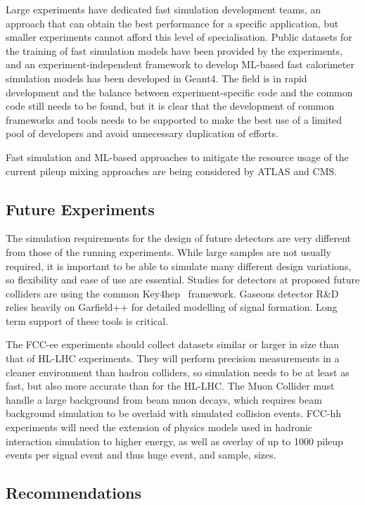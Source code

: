 \documentclass[10pt,a4paper]{article}
\begin{document}
Large experiments have dedicated fast simulation development teams, an approach
that can obtain the best performance for a specific application, but smaller
experiments cannot afford this level of specialisation. Public datasets for the
training of fast simulation models have been provided by the experiments, and an
experiment-independent framework to develop ML-based fast calorimeter simulation
models has been developed in Geant4. The field is in rapid development and the
balance between experiment-specific code and the common code still needs to be
found, but it is clear that the development of common frameworks and tools needs
to be supported to make the best use of a limited pool of developers and avoid
unnecessary duplication of efforts.

Fast simulation and ML-based approaches to mitigate the resource usage
of the current pileup mixing approaches are being considered by ATLAS
and CMS.

\subsection{Future Experiments}\label{future-experiments}

The simulation requirements for the design of future detectors are very
different from those of the running experiments. While large samples are not
usually required, it is important to be able to simulate many
different design variations, so flexibility and ease of use are
essential. Studies for detectors at proposed future colliders are using
the common Key4hep~\cite{Ganis2022} framework. Gaseous detector R\&D relies
heavily on Garfield++\cite{garfield++} for detailed modelling of signal
formation. Long term support of these tools is critical.

The FCC-ee experiments should collect datasets similar or
larger in size than that of HL-LHC experiments. They will perform precision
measurements in a cleaner environment than hadron colliders, so simulation
needs to be at least as fast, but also more accurate than for the HL-LHC. The
Muon Collider must handle a large background from beam muon decays, which
requires beam background simulation to be overlaid with simulated collision
events. FCC-hh experiments will need the extension of physics models used in
hadronic interaction simulation to higher energy, as well as overlay of up to
1000 pileup events per signal event and thus huge event, and sample, sizes.

\subsection{Recommendations}\label{recommendations-1}
\end{document}
